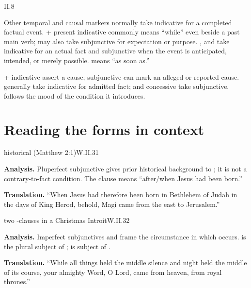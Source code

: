 \begin{courseunit}{II.8}
\begin{grammarbox}{Other temporal and causal markers}
 normally take indicative for a completed factual event.
 + present indicative commonly means ``while'' even beside a past main verb;
 may also take subjunctive for expectation or purpose.  , and
 take indicative for an actual fact and subjunctive when the event
is anticipated, intended, or merely possible.   means ``as soon as.''

 + indicative assert a cause; subjunctive can mark an alleged or
reported cause.   generally take indicative for admitted fact;
 and concessive  take subjunctive.   follows the mood of
the condition it introduces.
\end{grammarbox}

\section{Reading the forms in context}

\begin{workedexample}{historical  (Matthew 2:1)}{W.II.31}

\textbf{Analysis.}  Pluperfect subjunctive  gives prior historical
background to ; it is not a contrary-to-fact condition.  The clause means
``after/when Jesus had been born.''

\textbf{Translation.}  ``When Jesus had therefore been born in Bethlehem of Judah in the days
of King Herod, behold, Magi came from the east to Jerusalem.''
\end{workedexample}

\begin{workedexample}{two -clauses in a Christmas Introit}{W.II.32}

\textbf{Analysis.}  Imperfect subjunctives  and  frame the
circumstance in which  occurs.   is the plural subject of
;  is subject of .

\textbf{Translation.} ``While all things held the middle silence and night
held the middle of its course, your almighty Word, O Lord, came from heaven, from royal
thrones.''
\end{workedexample}


\end{courseunit}
